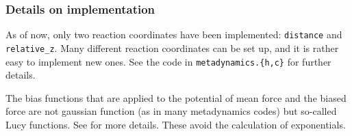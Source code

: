 \subsubsection{Details on implementation}

As of now, only two reaction coordinates have been implemented:
\texttt{distance} and \texttt{relative_z}. Many different reaction
coordinates can be set up, and it is rather easy to implement new
ones. See the code in \texttt{metadynamics.\{h,c\}} for further
details. 

The bias functions that are applied to the potential of mean force and
the biased force are not gaussian function (as in many metadynamics
codes) but so-called Lucy functions. See \cite{marsili09} for more
details. These avoid the calculation of exponentials.

